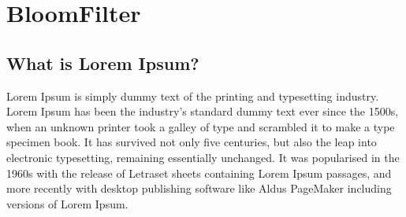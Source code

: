 \documentclass[11pt, a4paper]{article}
\begin{document}
\section*{BloomFilter}


\subsection{What is Lorem Ipsum?}

Lorem Ipsum is simply dummy text of the printing and typesetting industry. Lorem Ipsum has been the industry's standard dummy text ever since the 1500s, when an unknown printer took a galley of type and scrambled it to make a type specimen book. It has survived not only five centuries, but also the leap into electronic typesetting, remaining essentially unchanged. It was popularised in the 1960s with the release of Letraset sheets containing Lorem Ipsum passages, and more recently with desktop publishing software like Aldus PageMaker including versions of Lorem Ipsum.
\end{document}
